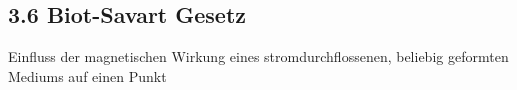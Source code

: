 \subsection*{3.6 Biot-Savart Gesetz}
    Einfluss der magnetischen Wirkung eines stromdurchflossenen, beliebig geformten Mediums auf einen Punkt
